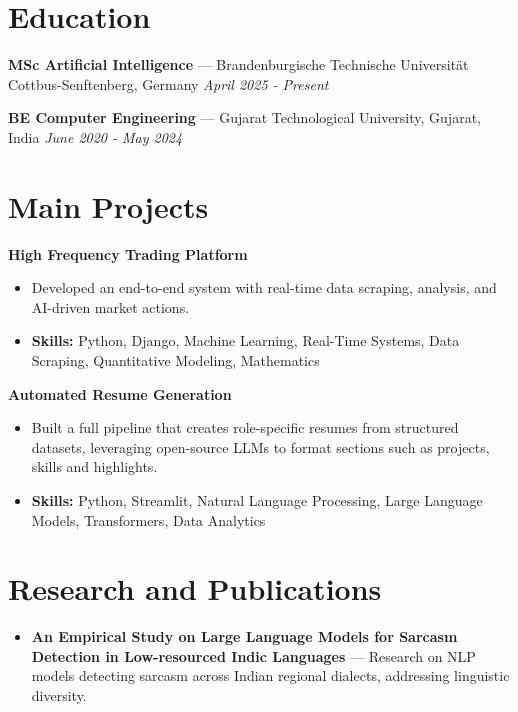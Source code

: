 \documentclass[a4paper,10pt]{article}
\begin{document}
\section*{Education}
\textbf{MSc Artificial Intelligence} — Brandenburgische Technische Universität Cottbus-Senftenberg, Germany \hfill \textit{April 2025 - Present}\par
\vspace{1.5pt}
\textbf{BE Computer Engineering} — Gujarat Technological University, Gujarat, India \hfill \textit{June 2020 - May 2024}\par

\section*{Main Projects}
\textbf{High Frequency Trading Platform}\par
\vspace{1pt}
\begin{itemize}
  \item Developed an end-to-end system with real-time data scraping, analysis, and AI-driven market actions.
  \item \textbf{Skills:} Python, Django, Machine Learning, Real-Time Systems, Data Scraping, Quantitative Modeling, Mathematics
\end{itemize}
\vspace{3pt}
\textbf{Automated Resume Generation}\par
\vspace{1pt}
\begin{itemize}
  \item Built a full pipeline that creates role-specific resumes from structured datasets, leveraging open-source LLMs to format sections such as projects, skills and highlights.
  \item \textbf{Skills:} Python, Streamlit, Natural Language Processing, Large Language Models, Transformers, Data Analytics
\end{itemize}

\section*{Research and Publications}
\begin{itemize}
\item \textbf{An Empirical Study on Large Language Models for Sarcasm Detection in Low-resourced Indic Languages} — Research on NLP models detecting sarcasm across Indian regional dialects, addressing linguistic diversity.
\end{itemize}
\end{document}
